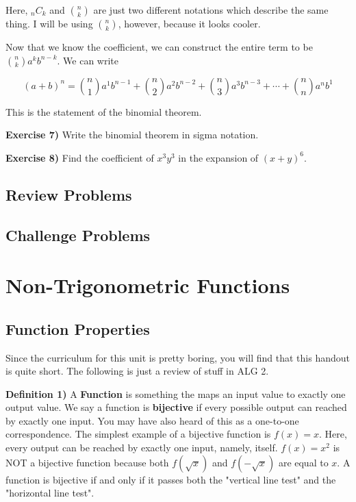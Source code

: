 \documentclass[a4paper]{article}
\begin{document}
Here, $_{n} C_{k}$ and $\binom{n}{k}$ are just two different notations which describe the same thing. I will be using $\binom{n}{k}$, however, because it looks cooler.

Now that we know the coefficient, we can construct the entire term to be $\binom{n}{k}a^{k}b^{n-k}$. We can write

$$(a+b)^n=\binom{n}{1}a^{1}b^{n-1} + \binom{n}{2}a^{2}b^{n-2} + \binom{n}{3}a^{3}b^{n-3} + \cdots + \binom{n}{n}a^{n}b^{1}$$

This is the statement of the binomial theorem.

\textbf{Exercise 7)} Write the binomial theorem in sigma notation.

\textbf{Exercise 8)} Find the coefficient of $x^3y^3$ in the expansion of $(x+y)^6$.
\subsection{Review Problems}

\subsection{Challenge Problems}

\newpage

\section{Non-Trigonometric Functions}

\subsection{Function Properties}

Since the curriculum for this unit is pretty boring, you will find that this handout is quite short. The following is just a review of stuff in ALG 2.

\textbf{Definition 1)} A \textbf{Function} is something the maps an input value to exactly one output value. We say a function is \textbf{bijective} if every possible output can reached by exactly one input. You may have also heard of this as a one-to-one correspondence. The simplest example of a bijective function is $f(x)=x$. Here, every output can be reached by exactly one input, namely, itself. $f(x)=x^2$ is NOT a bijective function because both $f(\sqrt{x})$ and $f(-\sqrt{x})$ are equal to $x$. A function is bijective if and only if it passes both the "vertical line test" and the "horizontal line test".
\end{document}
